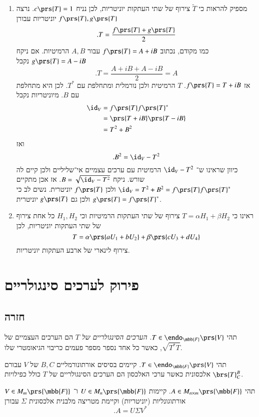 \documentclass[a4paper,10pt,oneside,openany]{article}
\begin{document}
\begin{solution}
\begin{enumerate}
\item 
מספיק להראות כי
$\tilde{T}$
צירוף של שתי העתקות יוניטריות, לכן נניח
$c\prs{T} = 1$.
נרצה
$f\prs{T}, g\prs{T}$
יוניטריות עבורן
\[\text{.} T = \frac{f\prs{T} + g\prs{T}}{2}\]
כמו מקודם, נכתוב
$f\prs{T} = A + iB$
עבור
$A,B$
הרמיטיות.
אם ניקח
$g\prs{T} = A - iB$
נקבל
\[\text{.} T = \frac{A + iB + A - iB}{2} = A\]
אז
$f\prs{T} = T + iB$.
$T$
הרמיטית ולכן נורמלית ומתחלפת עם
$T^*$.
לכן היא מתחלפת עם
$B$.
מיוניטריות נקבל
\begin{align*}
\id_V &= f\prs{T} f\prs{T}^*
\\&= \prs{T + iB} \prs{T - iB}
\\&= T^2 + B^2
\end{align*}
ואז
\[\text{.} B^2 = \id_V - T^2\]
כיוון שראינו ש־%
$\id_V - T^2$
הרמיטית עם ערכים עצמיים אי־שליליים ולכן קיים לה שורש.
ניקח
$B = \sqrt{\id_V - T^2}$.
אז אכן מתקיים
$\id_V = T^2 + B^2 = f\prs{T} f\prs{T}^*$
ולכן
$f\prs{T}$
יוניטרית.
נשים לב כי
$g\prs{T} = f\prs{T}^*$
ולכן גם
$g\prs{T}$
יוניטרית.
\item ראינו כי 
$T = \alpha H_1 + \beta H_2$
צירוף של שתי העתקות הרמיטיות וכי
$H_1, H_2$
כל אחת צירוף של שתי העתקות יוניטריות, לכן
\[T = \alpha \prs{a U_1 + b U_2} + \beta \prs{c U_3 + d U_4}\]
צירוף לינארי של ארבע העתקות יוניטריות.
\end{enumerate}
\end{solution}

\section{פירוק לערכים סינגולריים}

\subsection{חזרה}

\begin{definition}
תהי
$T \in \endo_{\mbb{F}}\prs{V}$.
\emph{הערכים הסינגולריים של
$T$}
הם הערכים העצמיים של
$\sqrt{T^* T}$,
כאשר כל אחד נספר מספר פעמים כריבוי הגיאומטרי שלו.
\end{definition}

\begin{theorem}
תהי
$T \in \endo_{\mbb{F}}\prs{V}$.
קיימים בסיסים אורתונורמליים
$B,C$
של
$V$
עבורם
$\brs{T}^B_C$
אלכסונית כאשר ערכי האלכסון הם הערכים הסינגולריים של
$T$
כולל כפילויות.
\end{theorem}

\begin{theorem}
תהי
$A \in M_{n \times m}\prs{\mbb{F}}$.
קיימות
$U \in M_n\prs{\mbb{F}}$
ו־%
$V \in M_m\prs{\mbb{F}}$
אורתוגונליות (יוניטריות) וקיימת מטריצה מלבנית אלכסונית
$\Sigma$
עבורן
\[\text{.} A = U \Sigma V^*\]
\end{theorem}
\end{document}
